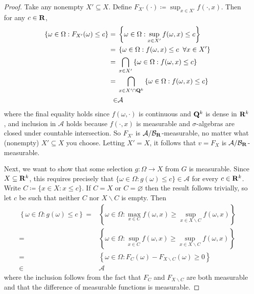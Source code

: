 \documentclass[11pt,letterpaper,reqno,oneside]{article}
\begin{document}
\begin{proof}
	Take any nonempty $X' \subseteq X$. Define $F_{X'}(\cdot) \coloneqq \sup_{x \in X'} f(\cdot,x)$. Then for any $c \in \mathbf{R}$,
	\begin{align*}
		\left\{ \omega \in \Omega : F_{X'}(\omega) \leq c \right\}
		={}& \left\{ \omega \in \Omega : \sup_{x \in X'} f(\omega,x) \leq c \right\}
		\\
		={}& \left\{ \omega \in \Omega : f(\omega,x) \leq c \;\;\forall x \in X' \right\}		
		\\
		={}& \bigcap_{x \in X'} 
		\left\{ \omega \in \Omega : f(\omega,x) \leq c \right\}		
		\\
		={}& \bigcap_{x \in X' \cap \mathbf{Q}^k} 
		\left\{ \omega \in \Omega : f(\omega,x) \leq c \right\}	
		\\
		\in& \mathcal{A}
	\end{align*}
	where the final equality holds since $f(\omega,\cdot)$ is continuous and $\mathbf{Q}^k$ is dense in $\mathbf{R}^k$, and inclusion in $\mathcal{A}$ holds because $f(\cdot,x)$ is measurable and $\sigma$-algebras are closed under countable intersection. So $F_{X'}$ is $\mathcal{A}/\mathcal{B}_{\mathbf{R}}$-measurable, no matter what (nonempty) $X' \subseteq X$ you choose. Letting $X' = X$, it follows that $v=F_X$ is $\mathcal{A}/\mathcal{B}_{\mathbf{R}}$-measurable.

	Next, we want to show that some selection $g : \Omega \to X$ from $G$ is measurable. Since $X \subseteq \mathbf{R}^k$, this requires precisely that $\{ \omega \in \Omega : g(\omega) \leq c \} \in \mathcal{A}$ for every $c \in \mathbf{R}^k$. Write $C \coloneqq \{ x \in X : x \leq c \}$. If $C=X$ or $C=\varnothing$ then the result follows trivially, so let $c$ be such that neither $C$ nor $X \backslash C$ is empty. Then
	\begin{align*}
		\left\{ \omega \in \Omega : g(\omega) \leq c \right\} 
		={}& \left\{ \omega \in \Omega : \max_{x \in C} f(\omega,x) 
		\geq \sup_{x \in X \backslash C} f(\omega,x) \right\} 
		\\
		={}& \left\{ \omega \in \Omega : \sup_{x \in C} f(\omega,x) 
		\geq \sup_{x \in X \backslash C} f(\omega,x) \right\} 
		\\
		={}& \left\{ \omega \in \Omega : F_{C}(\omega) 
		- F_{X \backslash C}(\omega) \geq 0 \right\} 
		\\
		\in& \mathcal{A}
	\end{align*}
	where the inclusion follows from the fact that $F_C$ and $F_{X\backslash C}$ are both measurable and that the difference of measurable functions is measurable.
\end{proof}
\end{document}

